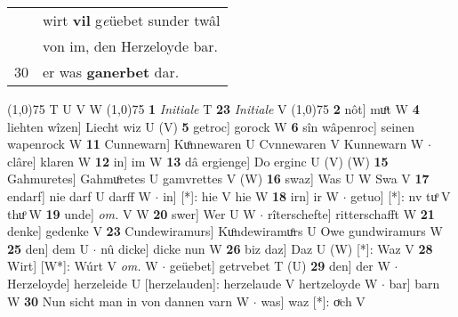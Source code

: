 \documentclass[8pt,a4paper,notitlepage]{article}
\begin{document}
\begin{table}[ht]
\begin{minipage}[t]{0.5\linewidth}
\begin{tabular}{rl}
 & wirt \textbf{vil} g\textit{e}üebet sunder twâl\\ 
 & von im, den Herzeloyde bar.\\ 
30 & er was \textbf{ganerbet} dar.\\ 
\end{tabular}
\scriptsize
\line(1,0){75} \newline
T U V W \newline
\line(1,0){75} \newline
\textbf{1} \textit{Initiale} T  \textbf{23} \textit{Initiale} V  \newline
\line(1,0){75} \newline
\textbf{2} nôt] muͦt W \textbf{4} liehten wîzen] Liecht wiz U (V) \textbf{5} getroc] gorock W \textbf{6} sîn wâpenroc] seinen wapenrock W \textbf{11} Cunnewarn] Kuͦnnewaren U Cvnnewaren V Kunnewarn W  $\cdot$ clâre] klaren W \textbf{12} in] im W \textbf{13} dâ ergienge] Do erginc U (V) (W) \textbf{15} Gahmuretes] Gahmuͦretes U gamvrettes V (W) \textbf{16} swaz] Was U W Swa V \textbf{17} endarf] nie darf U darff W  $\cdot$ in] [*]: hie V hie W \textbf{18} irn] ir W  $\cdot$ getuo] [*]: nv tuͦ V thuͦ W \textbf{19} unde] \textit{om.} V W \textbf{20} swer] Wer U W  $\cdot$ rîterschefte] ritterschafft W \textbf{21} denke] gedenke V \textbf{23} Cundewiramurs] Kuͦndewiramuͦrs U Owe gundwiramurs W \textbf{25} den] dem U  $\cdot$ nû dicke] dicke nun W \textbf{26} biz daz] Daz U (W) [*]: Waz  V \textbf{28} Wirt] [W*]: Wúrt V \textit{om.} W  $\cdot$ geüebet] getrvebet T (U) \textbf{29} den] der W  $\cdot$ Herzeloyde] herzeleide U [herzelauden]: herzelaude V hertzeloyde W  $\cdot$ bar] barn W \textbf{30} Nun sicht man in von dannen varn W  $\cdot$ was] waz [*]: oͮch V \newline
\end{minipage}
\end{table}
\end{document}
